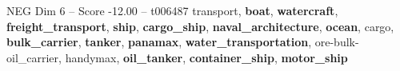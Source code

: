 \begin{textsample}{NEG Dim 6 – Score -12.00 – t006487}  \label{ex:f6_neg_008}
transport, \textbf{boat}, \textbf{watercraft}, \textbf{freight\_transport}, \textbf{ship}, \textbf{cargo\_ship}, \textbf{naval\_architecture}, \textbf{ocean}, cargo, \textbf{bulk\_carrier}, \textbf{tanker}, \textbf{panamax}, \textbf{water\_transportation}, ore-bulk-oil\_carrier, handymax, \textbf{oil\_tanker}, \textbf{container\_ship}, \textbf{motor\_ship}

\end{textsample}
